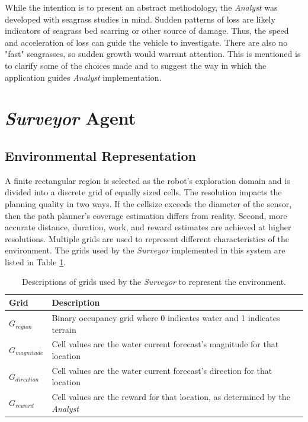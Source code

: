 \documentclass{tamuccthesis}
\begin{document}
While the intention is to present an abstract methodology, the \textit{Analyst} was developed with seagrass studies in mind. Sudden patterns of loss are likely indicators of seagrass bed scarring or other source of damage. Thus, the speed and acceleration of loss can guide the vehicle to investigate. There are also no "fast" seagrasses, so sudden growth would warrant attention. This is mentioned is to clarify some of the choices made and to suggest the way in which the application guides \textit{Analyst} implementation. 

\section{\textit{Surveyor} Agent}

\subsection{Environmental Representation}

A finite rectangular region is selected as the robot's exploration domain and is divided into a discrete grid of equally sized cells. The resolution impacts the planning quality in two ways. If the cellsize exceeds the diameter of the sensor, then the path planner's coverage estimation differs from reality. Second, more accurate distance, duration, work, and reward estimates are achieved at higher resolutions. Multiple grids are used to represent different characteristics of the environment. The grids used by the \textit{Surveyor} implemented in this system are listed in Table \ref{tbl:grids}. 

\begin{table}[H]\small
\center
\begin{tabular}{|l|l|}
\hline
Grid            & Description \\
\hline
$G_{region}$    & Binary occupancy grid where 0 indicates water and 1 indicates terrain \\
\hline
$G_{magnitude}$ & Cell values are the water current forecast's magnitude for that location \\
\hline
$G_{direction}$ & Cell values are the water current forecast's direction for that location \\
\hline
$G_{reward}$    & Cell values are the reward for that location, as determined by the \textit{Analyst} \\    
\hline
\end{tabular}
\caption{Descriptions of grids used by the \textit{Surveyor} to represent the environment.}
\label{tbl:grids}
\end{table}
\end{document}

